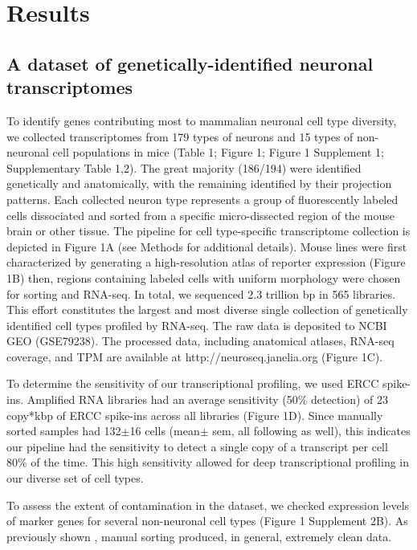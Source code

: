 \section{Results}

\subsection{A dataset of genetically-identified neuronal transcriptomes}
To identify genes contributing most to mammalian neuronal cell type diversity, we collected transcriptomes from 179 types of neurons and 15 types of non-neuronal cell populations in mice (Table 1; Figure 1; Figure 1 Supplement 1; Supplementary Table 1,2). The great majority (186/194) were identified genetically and anatomically, with the remaining identified by their projection patterns. Each collected neuron type represents a group of fluorescently labeled cells dissociated and sorted from a specific micro-dissected region of the mouse brain or other tissue. The pipeline for cell type-specific transcriptome collection is depicted in Figure 1A (see Methods for additional details). Mouse lines were first characterized by generating a high-resolution atlas of reporter expression (Figure 1B) then, regions containing labeled cells with uniform morphology were chosen for sorting and RNA-seq. In total, we sequenced 2.3 trillion bp in 565 libraries. This effort constitutes the largest and most diverse single collection of genetically identified cell types profiled by RNA-seq. The raw data is deposited to NCBI GEO (GSE79238). The processed data, including anatomical atlases, RNA-seq coverage, and TPM are available at http://neuroseq.janelia.org (Figure 1C).

To determine the sensitivity of our transcriptional profiling, we used ERCC spike-ins. Amplified RNA libraries had an average sensitivity (50\% detection) of 23 copy*kbp of ERCC spike-ins across all libraries (Figure 1D). Since manually sorted samples had 132$\pm$16 cells (mean$\pm$ sem, all following as well), this indicates our pipeline had the sensitivity to detect a single copy of a transcript per cell 80\% of the time. This high sensitivity allowed for deep transcriptional profiling in our diverse set of cell types.

To assess the extent of contamination in the dataset, we checked expression levels of marker genes for several non-neuronal cell types (Figure 1 Supplement 2B). As previously shown \citep{Okaty_2011}, manual sorting produced, in general, extremely clean data.

